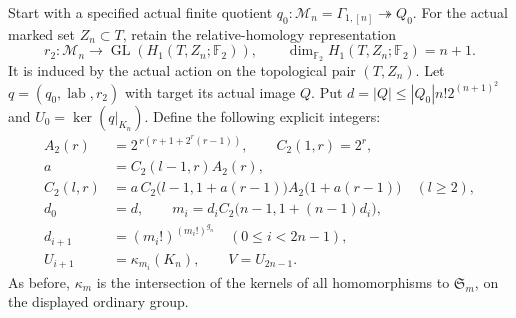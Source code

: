 Start with a specified actual finite quotient
$q_0:\mathcal M_n=\Gamma_{1,[n]}\twoheadrightarrow Q_0$.
For the actual marked set $Z_n\subset T$, retain the relative-homology
representation
\[
 r_2:\mathcal M_n\longrightarrow
          \operatorname{GL}(H_1(T,Z_n;\mathbb F_2)),\qquad
 \dim_{\mathbb F_2}H_1(T,Z_n;\mathbb F_2)=n+1.
                                                               \tag{ICR.14}
\]
It is induced by the actual action on the topological pair $(T,Z_n)$.
Let $q=(q_0,\operatorname{lab},r_2)$ with target its actual image $Q$.
Put $d=|Q|\leq |Q_0|n!2^{(n+1)^2}$ and
$U_0=\ker(q|_{K_n})$.  Define the following explicit integers:
\[
 \begin{split}
 A_2(r)&=2^{\,r(r+1+2^r(r-1))},\qquad C_2(1,r)=2^r,\\
 a&=C_2(l-1,r)A_2(r),\\
 C_2(l,r)&=a\,C_2\bigl(l-1,1+a(r-1)\bigr)
                        A_2\bigl(1+a(r-1)\bigr)\quad(l\geq2),\\
 d_0&=d,\qquad
 m_i=d_i C_2\bigl(n-1,1+(n-1)d_i\bigr),\\
 d_{i+1}&=(m_i!)^{(m_i!)^{g_n}}\quad(0\leq i<2n-1),\\
 U_{i+1}&=\kappa_{m_i}(K_n),\qquad V=U_{2n-1}.
 \end{split}                                                    \tag{ICR.4}
\]
As before, $\kappa_m$ is the intersection of the kernels of all
homomorphisms to $\mathfrak S_m$, on the displayed ordinary group.

